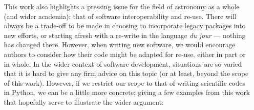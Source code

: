 \documentclass[5p,authoryear]{elsarticle}
\begin{document}
This work also highlights a pressing issue for the field of astronomy as a whole (and wider academia): that of software interoperability and re-use. 
There will always be a trade-off to be made in choosing to incorporate legacy packages into new efforts, or starting afresh with a re-write in the language \textit{du jour} --- nothing has changed there. 
However, when writing new software, we would encourage authors to consider how their code might be adapted for re-use, either in part or in whole. 
In the wider context of software development, situations are so varied that it is hard to give any firm advice on this topic (or at least,  beyond the scope of this work). 
However, if we restrict our scope to that of writing scientific codes in Python, we can be a little more concrete; giving a few examples from this work that hopefully serve to illustrate the wider argument:
\end{document}
